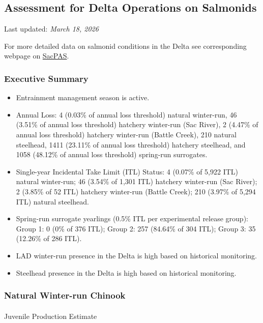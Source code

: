 \documentclass[
  letterpaper,
  DIV=11,
  numbers=noendperiod]{scrartcl}
\author{}
\date{}
\makeatletter
\let\oldparagraph\paragraph
\renewcommand{\paragraph}{
    \@ifstar
      \xxxParagraphStar
      \xxxParagraphNoStar
  }
\newcommand{\xxxParagraphStar}[1]{\oldparagraph*{#1}\mbox{}}
\newcommand{\xxxParagraphNoStar}[1]{\oldparagraph{#1}\mbox{}}
\makeatother
\begin{document}
\subsection{Assessment for Delta Operations on
Salmonids}\label{assessment-for-delta-operations-on-salmonids}

Last updated: \emph{March 18, 2026}

For more detailed data on salmonid conditions in the Delta see
corresponding webpage on
\href{https://www.cbr.washington.edu/sacramento/workgroups/salmon_monitoring.html}{SacPAS}.

\subsubsection{Executive Summary}\label{executive-summary}

\begin{itemize}
\item
  Entrainment management season is active.
\item
  Annual Loss: 4 (0.03\% of annual loss threshold) natural winter-run,
  46 (3.51\% of annual loss threshold) hatchery winter-run (Sac River),
  2 (4.47\% of annual loss threshold) hatchery winter-run (Battle
  Creek), 210 natural steelhead, 1411 (23.11\% of annual loss threshold)
  hatchery steelhead, and 1058 (48.12\% of annual loss threshold)
  spring-run surrogates.
\item
  Single-year Incidental Take Limit (ITL) Status: 4 (0.07\% of 5,922
  ITL) natural winter-run; 46 (3.54\% of 1,301 ITL) hatchery winter-run
  (Sac River); 2 (3.85\% of 52 ITL) hatchery winter-run (Battle Creek);
  210 (3.97\% of 5,294 ITL) natural steelhead.
\item
  Spring-run surrogate yearlings (0.5\% ITL per experimental release
  group): Group 1: 0 (0\% of 376 ITL); Group 2: 257 (84.64\% of 304
  ITL); Group 3: 35 (12.26\% of 286 ITL).
\item
  LAD winter-run presence in the Delta is high based on historical
  monitoring.
\item
  Steelhead presence in the Delta is high based on historical
  monitoring.
\end{itemize}

\subsubsection{Natural Winter-run
Chinook}\label{natural-winter-run-chinook}

\paragraph{Juvenile Production
Estimate}\label{juvenile-production-estimate}
\end{document}
